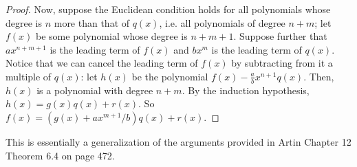 {\begin{proof}
Now, suppose the Euclidean condition holds for all polynomials 
whose degree is $n$ more than that of $q(x)$, i.e. all polynomials
of degree $n + m$; let $f(x)$ be some polynomial whose degree is 
$n + m + 1$. Suppose further that $ax^{n + m + 1}$ is the leading 
term of $f(x)$ and $bx^m$ is the leading term of $q(x)$. Notice
that we can cancel the leading term of $f(x)$ by subtracting from
it a multiple of $q(x)$: let $h(x)$ be the polynomial $f(x) - 
\frac{a}{b}x^{n + 1}q(x)$. Then, $h(x)$ is a polynomial with 
degree $n + m$. By the induction hypothesis, $h(x) = g(x)q(x) +
r(x)$. So $f(x) = (g(x) + ax^{m + 1}/b)q(x) + r(x)$.
\end{proof}

\begin{lem}
\end{lem}

This is essentially a generalization of the arguments provided
in Artin Chapter 12 Theorem 6.4 on page 472.
}
